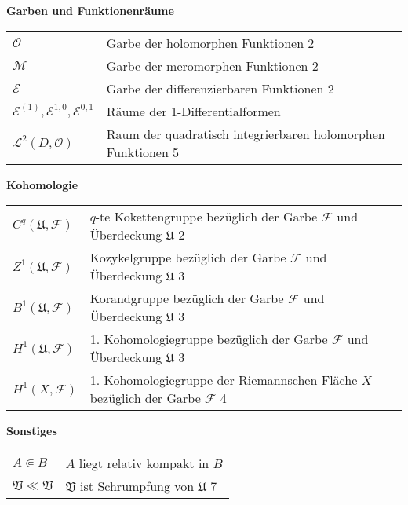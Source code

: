 \documentclass[11pt,a4paper,toc=bibliography]{scrartcl}
\theoremstyle{thm}
\theoremstyle{def}
\theoremstyle{remark}
\begin{document}

\textbf{Garben und Funktionenräume}

\begin{longtable}{p{3.5cm} p{12cm}}
$\mathcal{O}$ & Garbe der holomorphen Funktionen  2\\
$\mathcal{M}$ & Garbe der meromorphen Funktionen  2\\
$\mathcal{E}$ & Garbe der differenzierbaren Funktionen  2\\
$\mathcal{E}^{(1)},\mathcal{E}^{1,0},\mathcal{E}^{0,1}$ & Räume der 1-Differentialformen\\
$\mathcal{L}^2(D,\mathcal{O})$ & Raum der quadratisch integrierbaren holomorphen Funktionen  5\\

\end{longtable}

\textbf{Kohomologie}

\begin{longtable}{p{3.5cm} p{12cm}}
$C^q(\mathfrak{U},\mathcal{F})$ & $q$-te Kokettengruppe bezüglich der Garbe $\mathcal{F}$ und Überdeckung $\mathfrak{U}$  2\\
$Z^1(\mathfrak{U},\mathcal{F})$ & Kozykelgruppe bezüglich der Garbe $\mathcal{F}$ und Überdeckung $\mathfrak{U}$  3\\
$B^1(\mathfrak{U},\mathcal{F})$ & Korandgruppe bezüglich der Garbe $\mathcal{F}$ und Überdeckung $\mathfrak{U}$  3\\
$H^1(\mathfrak{U},\mathcal{F})$ & 1. Kohomologiegruppe bezüglich der Garbe $\mathcal{F}$ und Überdeckung $\mathfrak{U}$  3\\
$H^1(X,\mathcal{F})$ & 1. Kohomologiegruppe der Riemannschen Fläche $X$ bezüglich der Garbe $\mathcal{F}$  4\\
\end{longtable}
\textbf{Sonstiges}
\begin{longtable}{p{3.5cm} p{12cm}}
$A\Subset B$ & $A$ liegt relativ kompakt in $B$\\
$\mathfrak{V}\ll\mathfrak{V}$ & $\mathfrak{V}$ ist Schrumpfung von $\mathfrak{U}$  7\\
\end{longtable}
\newpage


\end{document}
